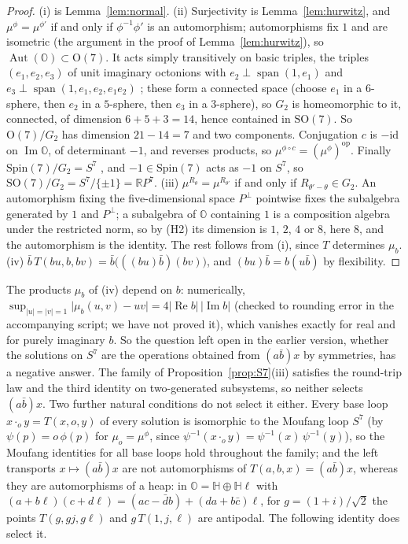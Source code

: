\documentclass[11pt,reqno]{amsart}
\theoremstyle{definition}
\theoremstyle{remark}
\numberwithin{equation}{section}
\newcommand{\R}{\mathbb{R}}
\newcommand{\HH}{\mathbb{H}}
\newcommand{\Aut}{\operatorname{Aut}}
\newcommand{\re}{\operatorname{Re}}
\newcommand{\im}{\operatorname{Im}}
\newcommand{\SO}{\mathrm{SO}}
\newcommand{\OO}{\mathrm{O}}
\begin{document}
\begin{proof}
(i) is Lemma~\ref{lem:normal}.  (ii) Surjectivity is Lemma~\ref{lem:hurwitz}, and $\mu^\phi=\mu^{\phi'}$ if and only if $\phi^{-1}\phi'$ is an
automorphism; automorphisms fix $1$ and are isometric (the argument in the proof of Lemma~\ref{lem:hurwitz}), so
$\Aut(\mathbb O)\subset\OO(7)$.  It acts simply transitively on basic triples, the triples $(e_1,e_2,e_3)$ of unit imaginary octonions with
$e_2\perp\operatorname{span}(1,e_1)$ and $e_3\perp\operatorname{span}(1,e_1,e_2,e_1e_2)$ \cite[\S4.1]{Baez02}; these form a connected space (choose
$e_1$ in a $6$-sphere, then $e_2$ in a $5$-sphere, then $e_3$ in a $3$-sphere), so $G_2$ is homeomorphic to it, connected, of dimension
$6+5+3=14$, hence contained in $\SO(7)$.  So $\OO(7)/G_2$ has dimension $21-14=7$ and two components.  Conjugation $c$ is
$-\mathrm{id}$ on $\im\mathbb O$, of determinant $-1$, and reverses products, so $\mu^{\phi\circ c}=(\mu^\phi)^{\mathrm{op}}$.  Finally
$\mathrm{Spin}(7)/G_2=S^7$ \cite[\S4.1]{Baez02}, and $-1\in\mathrm{Spin}(7)$ acts as $-1$ on $S^7$, so $\SO(7)/G_2=S^7/\{\pm1\}=\R P^7$.  (iii) $\mu^{R_\theta}=\mu^{R_{\theta'}}$
if and only if $R_{\theta'-\theta}\in G_2$.  An automorphism fixing the five-dimensional space $P^\perp$ pointwise fixes the subalgebra generated
by $1$ and $P^\perp$; a subalgebra of $\mathbb O$ containing $1$ is a composition algebra under the restricted norm, so by (H2) its dimension
is $1$, $2$, $4$ or $8$, here $8$, and the automorphism is the identity.  The rest follows from (i), since $T$ determines $\mu_b$.
(iv) $\bar b\,T(bu,b,bv)=\bar b\bigl(((bu)\bar b)(bv)\bigr)$, and $(bu)\bar b=b(u\bar b)$ by flexibility.
\end{proof}

The products $\mu_b$ of (iv) depend on $b$: numerically, $\sup_{\lvert u\rvert=\lvert v\rvert=1}\lvert\mu_b(u,v)-uv\rvert=4\lvert\re b\rvert\,\lvert\im b\rvert$
(checked to rounding error in the accompanying script; we have not proved it), which vanishes exactly for real and for purely imaginary $b$.  So the question left open in the earlier version, whether the solutions on $S^7$ are the operations
obtained from $(a\bar b)x$ by symmetries, has a negative answer.  The family of Proposition~\ref{prop:S7}(iii) satisfies the round-trip
law and the third identity on two-generated subsystems, so neither selects $(a\bar b)x$.  Two further natural conditions do not select
it either.  Every base loop $x\cdot_oy=T(x,o,y)$ of every solution is isomorphic to the Moufang loop $S^7$ (by
$\psi(p)=o\,\phi(p)$ for $\mu_o=\mu^\phi$, since $\psi^{-1}(x\cdot_oy)=\psi^{-1}(x)\,\psi^{-1}(y)$), so the Moufang identities for all base loops hold
throughout the family; and the left transports $x\mapsto(a\bar b)x$ are not automorphisms of $T(a,b,x)=(a\bar b)x$, whereas they are
automorphisms of a heap: in $\mathbb O=\HH\oplus\HH\ell$ with $(a+b\ell)(c+d\ell)=(ac-\bar db)+(da+b\bar c)\ell$, for $g=(1+i)/\sqrt2$ the points $T(g,gj,g\ell)$ and $g\,T(1,j,\ell)$ are
antipodal.  The following identity does select it.
\end{document}

